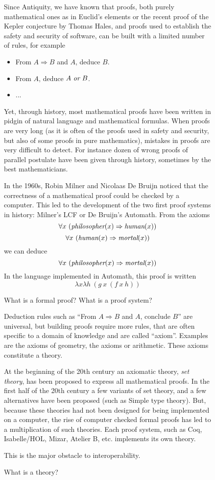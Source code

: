 \begin{figure}
\begin{framed}
Since Antiquity, we have known that
proofs, both purely mathematical ones as in Euclid's elements or the
recent proof of the Kepler conjecture by Thomas Hales, and proofs used
to establish the safety and security of software, can be built with a
limited number of rules, for example
\begin{itemize}
\item From $A \Rightarrow B$ and $A$, deduce $B$.
\item From $A$, deduce $A~\mbox{\it or}~B$.
\item ...
\end{itemize}
Yet, through history, most mathematical proofs have been written in
pidgin of natural language and mathematical formulas. When proofs are
very long (as it is often of the proofs used in safety and security,
but also of some proofs in pure mathematics), mistakes in proofs are
very difficult to detect. For instance dozen of wrong proofs of
parallel postulate have been given through history, sometimes by the
best mathematicians.

In the 1960s, Robin Milner and Nicolaas De Bruijn noticed that the
correctness of a mathematical proof could be checked by a
computer. This led to the development of the two first proof systems
in history: Milner's {\sc LCF} or De Bruijn's {\sc Automath}.  From
the axioms
$$\forall x~(\mbox{\em philosopher}(x) \Rightarrow \mbox{\em human}(x))$$
$$\forall x~(\mbox{\em human}(x) \Rightarrow \mbox{\em mortal}(x))$$
we can deduce
$$\forall x~(\mbox{\em philosopher}(x) \Rightarrow \mbox{\em mortal}(x))$$
In the language implemented in {\sc Automath}, this proof is written
$$\lambda x \lambda h~(g~x~(f~x~h))$$

\caption{What is a formal proof? What is a proof system?\label{formal}}
\end{framed}
\end{figure}

\begin{figure}
\begin{framed}
Deduction rules such as ``From $A \Rightarrow B$ and $A$, conclude
$B$'' are universal, but building proofs require more rules, that are
often specific to a domain of knowledge and are called
``axiom''. Examples are the axioms of geometry, the axioms or
arithmetic. These axioms constitute a theory.

At the beginning of the 20th century an axiomatic theory, {\em set
  theory}, has been proposed to express all mathematical proofs. In
the first half of the 20th century a few variants of set theory, and a
few alternatives have been proposed (such as Simple type theory).
But, because these theories had not been designed for being
implemented on a computer, the rise of computer checked formal proofs
has led to a multiplication of such theories. Each proof system,
such as {\sc Coq}, {\sc Isabelle/HOL}, {\sc Mizar}, {\sc Atelier B},
etc. implements its own theory.

This is the major obstacle to interoperability.
\caption{What is a theory?\label{theory}}
\end{framed}
\end{figure}


